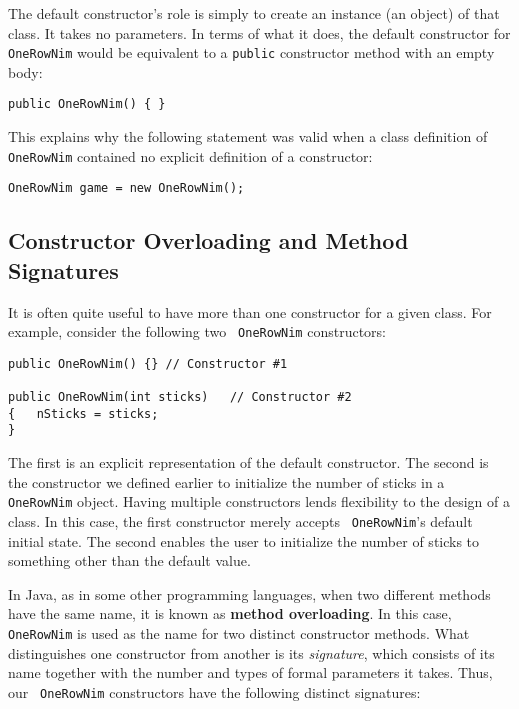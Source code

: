 \noindent The default constructor's role is simply to create an
instance (an object) of that class.  It takes no parameters.  In
terms of what it does, the default constructor for {\tt OneRowNim}
would be equivalent to a {\tt public} constructor method with an
empty body:

\begin{jjjlisting}
\begin{lstlisting}
public OneRowNim() { }
\end{lstlisting}
\end{jjjlisting}

\noindent This explains why the following statement
was valid when a class definition of {\tt OneRowNim} contained no
explicit definition of a constructor:

\begin{jjjlisting}
\begin{lstlisting}
OneRowNim game = new OneRowNim();
\end{lstlisting}
\end{jjjlisting}

\subsection{Constructor Overloading and Method Signatures}

\noindent It is often quite useful to have more than one constructor for
a given class.  For example, consider the following two {\tt
OneRowNim} constructors:

\begin{jjjlisting}
\begin{lstlisting}
public OneRowNim() {} // Constructor #1

public OneRowNim(int sticks)   // Constructor #2
{   nSticks = sticks;
}
\end{lstlisting}
\end{jjjlisting}

\noindent The first is an explicit representation
of the default constructor.  The second is the constructor we defined
earlier to initialize the number of sticks in a {\tt OneRowNim}
object. Having multiple constructors lends flexibility to the design
of a class. In this case, the first constructor merely accepts {\tt
OneRowNim}'s default initial state. The second enables the user to
initialize the number of sticks to something other than the default
value.

In Java, as in some other programming languages, when two different
methods have the same name, it is known as {\bf method overloading}.
In this case, {\tt OneRowNim} is used as the name for two distinct
constructor methods.  What distinguishes one constructor from another
is its {\it signature}, which consists of its name together with the
number and types of formal parameters it takes.  Thus, our {\tt
OneRowNim} constructors have the following distinct signatures:

